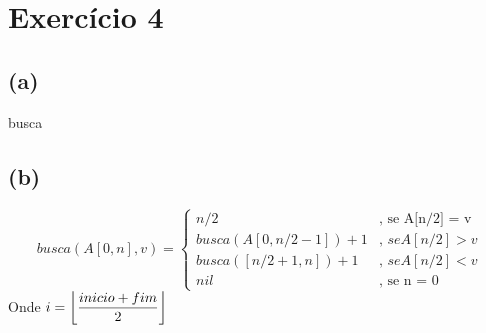 \documentclass{article}
\DeclarePairedDelimiter\floor{\lfloor}{\rfloor}
\begin{document}
\section{Exercício 4}
\subsection*{(a)}
\begin{algorithm}[H]
  \SetAlgoLined
  \label{alg1}
  \caption{busca}
\end{algorithm}

\subsection*{(b)}
\begin{equation}
    busca(A[0,n],v) = \begin{cases}
        n/2&\text{, se A[n/2] = v}\\
        busca(A[0,n/2-1]) + 1&\text{, $se A[n/2] > v$}\\
        busca([n/2+1, n]) + 1&\text{, $se A[n/2] < v$}\\
        nil&\text{, se n = 0}
    \end{cases}
\end{equation}
    Onde $i = \floor*{\dfrac{inicio+fim}{2}}$
\end{document}
